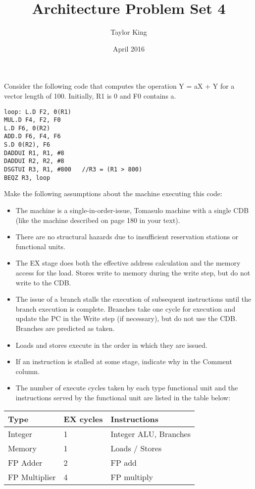 \documentclass{article}
\title{Architecture Problem Set 4}
\author{Taylor King }
\date{April 2016}
\begin{document}
\maketitle
\section{} Consider the following code that computes the operation Y = aX + Y for a vector length of 100. Initially, R1 is 0 and F0 contains a. 

\vspace{5mm}
\begin{lstlisting}
loop: L.D F2, 0(R1)
MUL.D F4, F2, F0
L.D F6, 0(R2)
ADD.D F6, F4, F6
S.D 0(R2), F6
DADDUI R1, R1, #8
DADDUI R2, R2, #8
DSGTUI R3, R1, #800   //R3 = (R1 > 800)
BEQZ R3, loop   
\end{lstlisting}

\vspace{1cm} 
Make the following assumptions about the machine executing this code:
\begin{itemize}
\item The machine is a single-in-order-issue, Tomasulo machine with a single CDB (like the machine described on page 180 in your text).
\item There are no structural hazards due to insufficient reservation stations or functional units.
\item The EX stage does both the effective address calculation and the memory access for the load. Stores write to memory during the write step, but do not write to the CDB.
\item The issue of a branch stalls the execution of subsequent instructions until the branch execution is complete. Branches take one cycle for execution and update the PC in the Write step (if necessary), but do not use the CDB. Branches are predicted as taken.
\item Loads and stores execute in the order in which they are issued.
\item If an instruction is stalled at some stage, indicate why in the Comment column.
\item The number of execute cycles taken by each type functional unit and the instructions served by the functional unit are listed in the table below:	
\end{itemize}

\begin{tabular}{|l|l|l|}
\hline
\textbf{Type} & \textbf{EX cycles} & \textbf{Instructions} \\
\hline
Integer & 1 & Integer ALU, Branches \\
Memory & 1 & Loads / Stores \\
FP Adder & 2 & FP add \\
FP Multiplier & 4 & FP multiply \\
\hline
\end{tabular}
\pagebreak
\end{document}
